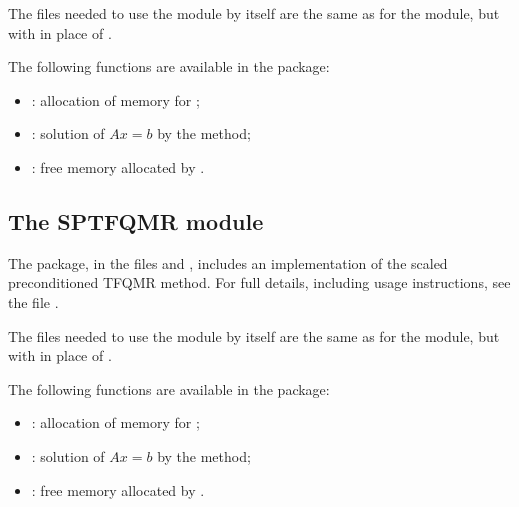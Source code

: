 The files needed to use the {\spbcg} module by itself are the same as for the
{\spgmr} module, but with  in place of
.

The following functions are available in the {\spbcg} package:  
\begin{itemize}
\item {}: allocation of memory for ;
\item {}: solution of $Ax = b$ by the {\spbcg} method;
\item {}: free memory allocated by .
\end{itemize}



\subsection{The SPTFQMR module}\label{ss:sptfqmr}

The {\sptfqmr} package, in the files  and
, includes an implementation of the scaled
preconditioned TFQMR method.  For full details,
including usage instructions, see the file .

The files needed to use the {\sptfqmr} module by itself are the same as for the
{\spgmr} module, but with  in place of
.

The following functions are available in the {\sptfqmr} package:  
\begin{itemize}
\item {}: allocation of memory for ;
\item {}: solution of $Ax = b$ by the {\sptfqmr} method;
\item {}: free memory allocated by .
\end{itemize}
